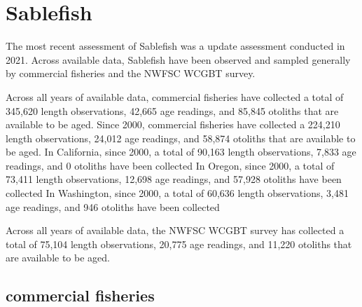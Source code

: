 \documentclass[11pt,
  english,
  letterpaper,
]{article}
\begin{document}

\hypertarget{sablefish}{%
\section{Sablefish}\label{sablefish}}

\leavevmode\tagmcend\tagstructend


The most recent assessment of Sablefish was a update assessment conducted in 2021. Across available data, Sablefish have been observed and sampled generally by commercial fisheries and the NWFSC WCGBT survey.

\leavevmode\tagmcend\tagstructend\par


Across all years of available data, commercial fisheries have collected a total of 345,620 length observations, 42,665 age readings, and 85,845 otoliths that are available to be aged. Since 2000, commercial fisheries have collected a 224,210 length observations, 24,012 age readings, and 58,874 otoliths that are available to be aged. In California, since 2000, a total of 90,163 length observations, 7,833 age readings, and 0 otoliths have been collected In Oregon, since 2000, a total of 73,411 length observations, 12,698 age readings, and 57,928 otoliths have been collected In Washington, since 2000, a total of 60,636 length observations, 3,481 age readings, and 946 otoliths have been collected

\leavevmode\tagmcend\tagstructend\par


Across all years of available data, the NWFSC WCGBT survey has collected a total of 75,104 length observations, 20,775 age readings, and 11,220 otoliths that are available to be aged.

\leavevmode\tagmcend\tagstructend\par


\hypertarget{commercial-fisheries-44}{%
\subsection{commercial fisheries}\label{commercial-fisheries-44}}
\end{document}
